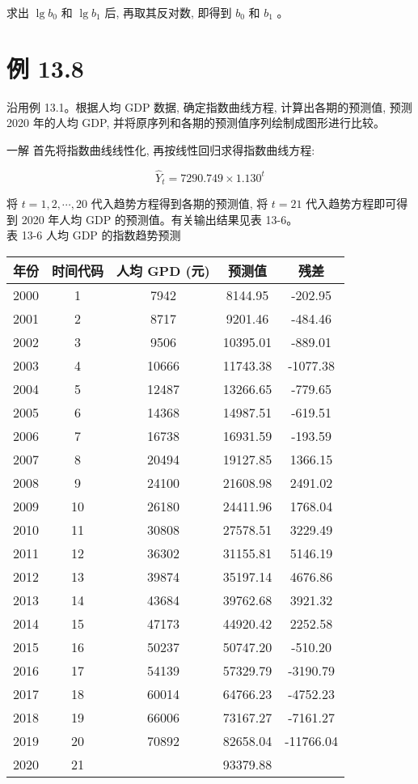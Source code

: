 \documentclass[10pt]{article}
\begin{document}
\begin{CJK*}{UTF8}{bsmi}
求出 $\lg b_{0}$ 和 $\lg b_{1}$ 后, 再取其反对数, 即得到 $b_{0}$ 和 $b_{1}$ 。

\section*{例 13.8}
沿用例 13.1。根据人均 GDP 数据, 确定指数曲线方程, 计算出各期的预测值, 预测 2020 年的人均 GDP, 并将原序列和各期的预测值序列绘制成图形进行比较。

一解 首先将指数曲线线性化, 再按线性回归求得指数曲线方程:

$$
\hat{Y}_{t}=7290.749 \times 1.130^{t}
$$

将 $t=1,2, \cdots, 20$ 代入趋势方程得到各期的预测值, 将 $t=21$ 代入趋势方程即可得到 2020 年人均 GDP 的预测值。有关输出结果见表 13-6。\\
表 13-6 人均 GDP 的指数趋势预测

\begin{center}
\begin{tabular}{ccccc}
\hline
年份 & 时间代码 & 人均 GPD (元) & 预测值 & 残差 \\
\hline
2000 & 1 & 7942 & 8144.95 & -202.95 \\
2001 & 2 & 8717 & 9201.46 & -484.46 \\
2002 & 3 & 9506 & 10395.01 & -889.01 \\
2003 & 4 & 10666 & 11743.38 & -1077.38 \\
2004 & 5 & 12487 & 13266.65 & -779.65 \\
2005 & 6 & 14368 & 14987.51 & -619.51 \\
2006 & 7 & 16738 & 16931.59 & -193.59 \\
2007 & 8 & 20494 & 19127.85 & 1366.15 \\
2008 & 9 & 24100 & 21608.98 & 2491.02 \\
2009 & 10 & 26180 & 24411.96 & 1768.04 \\
2010 & 11 & 30808 & 27578.51 & 3229.49 \\
2011 & 12 & 36302 & 31155.81 & 5146.19 \\
2012 & 13 & 39874 & 35197.14 & 4676.86 \\
2013 & 14 & 43684 & 39762.68 & 3921.32 \\
2014 & 15 & 47173 & 44920.42 & 2252.58 \\
2015 & 16 & 50237 & 50747.20 & -510.20 \\
2016 & 17 & 54139 & 57329.79 & -3190.79 \\
2017 & 18 & 60014 & 64766.23 & -4752.23 \\
2018 & 19 & 66006 & 73167.27 & -7161.27 \\
2019 & 20 & 70892 & 82658.04 & -11766.04 \\
2020 & 21 &  & 93379.88 &  \\
\hline
\end{tabular}
\end{center}


\end{CJK*}
\end{document}
